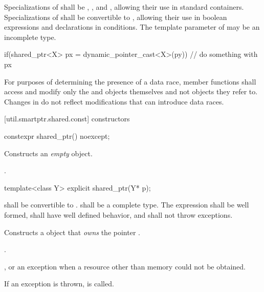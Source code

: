 \pnum
Specializations of  shall be ,
, and , allowing their use in standard
containers. Specializations of  shall be convertible to ,
allowing their use in boolean expressions and declarations in conditions. The template
parameter  of  may be an incomplete type.

\pnum
\enterexample
\begin{codeblock}
if(shared_ptr<X> px = dynamic_pointer_cast<X>(py)) {
  // do something with px
}
\end{codeblock}
\exitexample

\pnum
For purposes of determining the presence of a data race, member functions shall
access and modify only the  and  objects
themselves and not objects they refer to. Changes in  do not
reflect modifications that can introduce data races.

[util.smartptr.shared.const]{ constructors}

%
\begin{itemdecl}
constexpr shared_ptr() noexcept;
\end{itemdecl}

\begin{itemdescr}
\pnum\effects  Constructs an \textit{empty}  object.

\pnum\postconditions  {}.
\end{itemdescr}

%
\begin{itemdecl}
template<class Y> explicit shared_ptr(Y* p);
\end{itemdecl}

\begin{itemdescr}
\pnum\requires  {} shall be convertible to .
 shall be a complete type. The expression 
shall be well formed, shall have well defined behavior, and shall not
throw exceptions.

\pnum\effects Constructs a  object that \textit{owns} the pointer
.

\pnum\postconditions  {}.

\pnum\throws {}, or an  exception when a resource other than memory could not be obtained.

\pnum\exceptionsafety  If an exception is thrown,  is
called.
\end{itemdescr}


